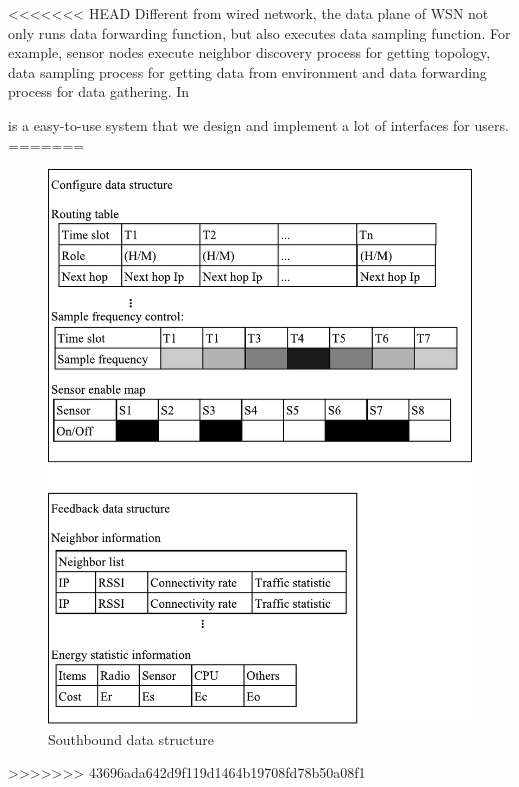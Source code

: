 <<<<<<< HEAD
Different from wired network, the data plane of WSN not only runs
data forwarding function, but also executes data sampling function. 
For example,  sensor nodes execute neighbor discovery process for getting topology, 
data sampling process for getting data from environment and data forwarding process
for data gathering. In

{\sdn} is a easy-to-use system that we design and implement a lot of 
interfaces for users.
=======
\begin{figure}[htbp]
	\centering
	\includegraphics[width=1\columnwidth]{Figure/southbound-data}
	\caption{Southbound data structure}
	\label{southbound-data}
\end{figure}
>>>>>>> 43696ada642d9f119d1464b19708fd78b50a08f1

